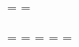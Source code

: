 \textwidth=\hsize
\textheight=\vsize

\endgroup
\newpage
\paperwidth=\pdfpageheight
\paperheight=\pdfpagewidth
\pdfpageheight=\paperheight
\pdfpagewidth=\paperwidth
\headwidth=\textwidth
\begin{comment}
	\begin{table}[!htb]%
		
		\renewcommand{\arraystretch}{1.7}
		\centering
		\begin{tabular}{c c c c c c}
			\hline	
			
			\textbf{Squadra} & \textbf{Abilità} & \textbf{SE} & \textbf{QSE} & \textbf{QV} & \textbf{Rank}   \\	
			\hline			
			Milan & 1.492 & 0.557 & 0.359 & 0.129 & 1\\
			Inter & 1.4 & 0.537 & 0.400 & 0.160 & 2\\
			Napoli & 1.17 & 0.530 & 0.389 & 0.152 & 3 \\
			Juventus & 0.825 & 0.520& 0.373& 0.139& 4\\
			Lazio & 0.459 & 0.516 & 0.368 & 0.135 & 5\\
			Roma & 0.413 & 0.516& 0.368& 0.135& 6\\
			Fiorentina & 0.339 & 0.511& 0.357& 0.127& 7\\
			Atalanta & 0.312 & 0.000 & 0.368& 0.135& 8 \\
			Hellas Verona & 0.049 & 0.513& 0.356& 0.127& 9\\
			Torino & -0.012 & 0.512 & 0.355& 0.126& 10 \\
			*Udinese & -0.072 & 0.512& 0.355 & 0.126& 12\\
			*Sassuolo & -0.145 & 0.511& 0.355 & 0.126& 11\\
			Bologna & -0.233 & 0.515& 0.359& 0.128& 13\\
			Empoli & -0.549 & 0.518& 0.362& 0.131& 14\\
			Sampdoria & -0.775 & 0.527& 0.372& 0.138& 15\\
			Spezia & -0.831 & 0.527& 0.372& 0.138& 16\\
			*Genoa & -0.879 & 0.532& 0.378& 0.143& 19 \\
			Cagliari & -0.897 & 0.532& 0.378& 0.143& 18\\
			*Salernitana & -0.91 & 0.527& 0.372& 0.138& 17\\
			Venezia & -1.156 & 0.538& 0.387& 0.149& 20\\
			\hline
			& & & & &\\
			
		\end{tabular} \hbox{}
		
		\caption{Per ogni squadra viene riportata l'abilità stimata, lo \emph{Standard 
				Error} (SE), il \emph{Quasi Standard Error} (QSE) e il \emph{Quasi Variance} (QV). Nella tabella viene indicato con un asterisco le squadre con un piazzamento stimato diverso da quello reale.} \label{tab:BTH}
	\end{table}
\end{comment}

